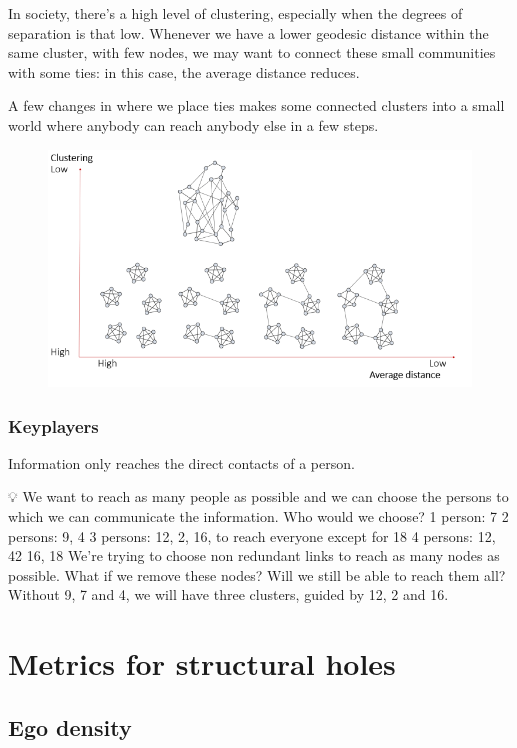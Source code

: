 \documentclass[
  notitlepage,
  onecolumn,
  openany]{book}
\begin{document}
In society, there's a high level of clustering, especially when the degrees of separation is that low. Whenever we have a lower geodesic distance within the same cluster, with few nodes, we may want to connect these small communities with some ties: in this case, the average distance reduces.

A few changes in where we place ties makes some connected clusters into a small world where anybody can reach anybody else in a few steps.

\begin{figure}[h!]

{\centering \includegraphics[width=0.6\linewidth]{images/07-Triads and structural holes/Untitled 4} 

}

\end{figure}

\hypertarget{keyplayers}{%
\subsection{Keyplayers}\label{keyplayers}}

Information only reaches the direct contacts of a person.

💡 We want to reach as many people as possible and we can choose the persons to which we can communicate the information. Who would we choose?
1 person: 7
2 persons: 9, 4
3 persons: 12, 2, 16, to reach everyone except for 18
4 persons: 12, 42 16, 18
We're trying to choose non redundant links to reach as many nodes as possible.
What if we remove these nodes? Will we still be able to reach them all? Without 9, 7 and 4, we will have three clusters, guided by 12, 2 and 16.

\hypertarget{metrics-for-structural-holes}{%
\chapter{Metrics for structural holes}\label{metrics-for-structural-holes}}

\hypertarget{ego-density}{%
\section{Ego density}\label{ego-density}}
\end{document}
